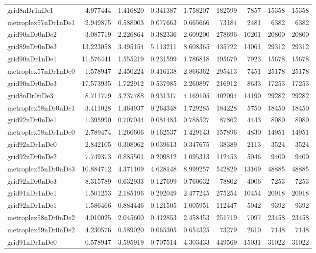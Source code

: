 \documentclass[../../../thesis.tex]{subfiles}
\begin{document}
\begin{longtable}{|l|r|r|r|r|r|r|r|r|}
grid8nDr1nDe1 & 4.977444 & 1.416820 & 0.341387 & 1.758207 & 182599 & 7857 & 15358 & 15358 \\
metroplex57nDr1nDe1 & 2.949875 & 0.588003 & 0.077663 & 0.665666 & 73184 & 2481 & 6382 & 6382 \\
grid90nDr0nDe2 & 3.087719 & 2.226864 & 0.382336 & 2.609200 & 278696 & 10201 & 20800 & 20800 \\
grid89nDr0nDe3 & 13.223058 & 3.495154 & 5.113211 & 8.608365 & 435722 & 14061 & 29312 & 29312 \\
grid90nDr1nDe1 & 11.576441 & 1.555219 & 0.231599 & 1.786818 & 195679 & 7923 & 15678 & 15678 \\
metroplex57nDr1nDe0 & 1.578947 & 2.450224 & 0.416138 & 2.866362 & 295413 & 7451 & 25178 & 25178 \\
grid90nDr0nDe3 & 17.573935 & 1.722912 & 0.537985 & 2.260897 & 216912 & 8633 & 17253 & 17253 \\
grid8nDr0nDe3 & 8.711779 & 3.237788 & 0.931317 & 4.169105 & 402094 & 14190 & 29282 & 29282 \\
metroplex58nDr0nDe1 & 3.411028 & 1.464937 & 0.264348 & 1.729285 & 184228 & 5750 & 18450 & 18450 \\
grid92nDr0nDe1 & 1.395990 & 0.707044 & 0.081483 & 0.788527 & 87862 & 4443 & 8080 & 8080 \\
metroplex58nDr1nDe0 & 2.789474 & 1.266606 & 0.162537 & 1.429143 & 157896 & 4830 & 14951 & 14951 \\
grid92nDr1nDe0 & 2.842105 & 0.308062 & 0.039613 & 0.347675 & 38389 & 2113 & 3524 & 3524 \\
grid92nDr0nDe2 & 7.749373 & 0.885501 & 0.209812 & 1.095313 & 112453 & 5046 & 9400 & 9400 \\
metroplex55nDr0nDe3 & 10.884712 & 4.371109 & 4.628148 & 8.999257 & 542829 & 13169 & 48885 & 48885 \\
grid92nDr0nDe3 & 8.315789 & 0.632933 & 0.127699 & 0.760632 & 78802 & 4006 & 7253 & 7253 \\
grid91nDr1nDe1 & 1.501253 & 2.185196 & 0.292049 & 2.477245 & 275254 & 10454 & 20918 & 20918 \\
grid92nDr1nDe1 & 1.586466 & 0.884446 & 0.121505 & 1.005951 & 112447 & 5042 & 9392 & 9392 \\
metroplex58nDr0nDe2 & 4.010025 & 2.045600 & 0.412853 & 2.458453 & 251719 & 7097 & 23458 & 23458 \\
metroplex59nDr0nDe2 & 4.230576 & 0.589020 & 0.065305 & 0.654325 & 73279 & 2610 & 7148 & 7148 \\
grid91nDr1nDe0 & 0.578947 & 3.595919 & 0.707514 & 4.303433 & 449569 & 15031 & 31022 & 31022 \\

\end{longtable}
\end{document}
